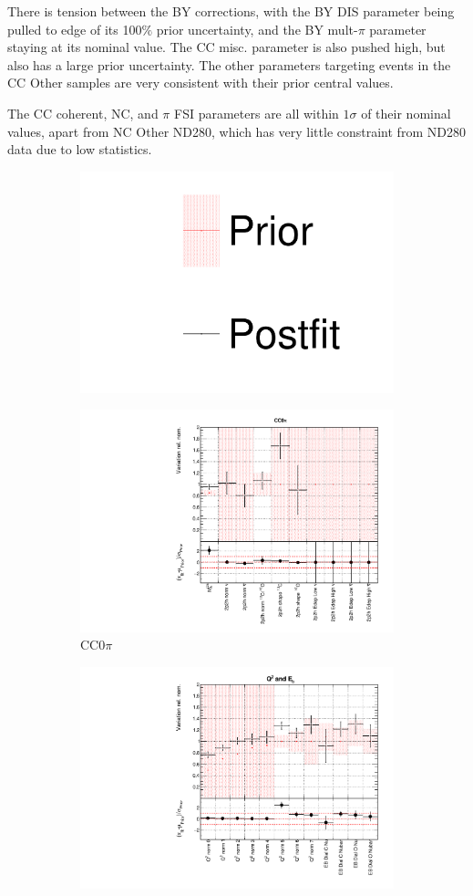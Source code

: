 There is tension between the BY corrections, with the BY DIS parameter being pulled to edge of its 100$\%$ prior uncertainty, and the BY mult-$\pi$ parameter staying at its nominal value. The CC misc. parameter is also pushed high, but also has a large prior uncertainty. The other parameters targeting events in the CC Other samples are very consistent with their prior central values. 

The CC coherent, NC, and $\pi$ FSI parameters are all within $1\sigma$ of their nominal values, apart from NC Other ND280, which has very little constraint from ND280 data due to low statistics. 

\begin{figure}
\centering
\begin{subfigure}{0.95\textwidth}
  \centering
  \includegraphics[width=0.25\linewidth]{figs/dat_leg}
  \caption{}
  \label{fig:}
\end{subfigure}
\begin{subfigure}{0.49\textwidth}
  \centering
  \includegraphics[width=0.95\linewidth]{figs/datxsec1}
  \caption{CC0$\pi$}
  \label{fig:}
\end{subfigure}
\begin{subfigure}{0.49\textwidth}
  \centering
  \includegraphics[width=0.95\linewidth]{figs/datxsec2}

\end{subfigure}
\end{figure}
